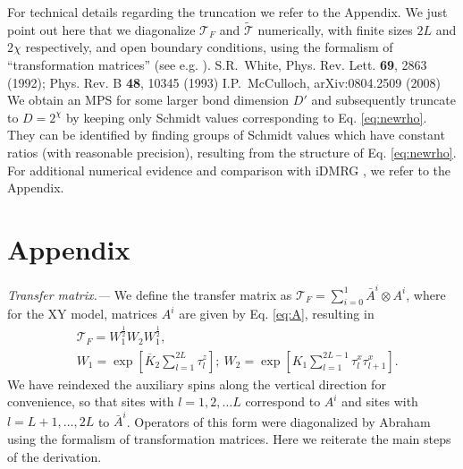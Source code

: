 \documentclass[prl,twocolumn,showpacs,floatfix,superscriptaddress,nofootinbib]{revtex4-1}
\newcommand{\Br}[1]{\left[#1\right]}
\begin{document}
\begin{thebibliography}{99}
 {For technical details regarding the truncation we refer to the Appendix. We just point out here that we diagonalize $\mathcal{T}_F$ and $\tilde{ \mathcal{T}}$ numerically, with finite sizes $2L$ and $2\chi$ respectively, and open boundary conditions, using the formalism of ``transformation matrices'' (see e.g.  \cite{Abraham1971}).}
  S.R.~White, Phys. Rev. Lett. {\bf 69}, 2863 (1992); 
 Phys. Rev. B {\bf 48}, 10345 (1993)
  I.P.~McCulloch, arXiv:0804.2509 (2008)
  We obtain an MPS for some larger bond dimension $D'$ and subsequently truncate to $D=2^\chi$ by keeping only Schmidt values corresponding to Eq. \eqref{eq:newrho}. They can be identified by finding groups of Schmidt values which have constant ratios (with reasonable precision), resulting from the structure of Eq. \eqref{eq:newrho}. 
 For additional numerical evidence and comparison with iDMRG \cite{DMRG,McCulloch2008}, we refer to the Appendix.

\end{thebibliography}
 

\renewcommand{\theequation}{A\arabic{equation}}
\setcounter{equation}{0}    %
\section*{Appendix}           %
\setcounter{figure}{0}                                           %
\renewcommand{\thefigure}{A\arabic{figure}}     %

{\it Transfer matrix.--- } We define the transfer matrix as $\mathcal{T}_F  = \sum_{i=0}^1 \bar{A}^{i} \otimes A^{i}$, where for the XY model, matrices $A^i$ are given by Eq. \eqref{eq:A}, resulting in
\begin{eqnarray}  
      &\mathcal{T}_F = W_1^{\frac12} W_2 W_1^{\frac12}, \\
      &W_1 = \exp\Br{\overline K_2 \sum_{l=1}^{2L}  \tau^z_l};  \ W_2 = \exp\Br{ K_1 \sum_{l=1}^{2L-1} \tau^x_l \tau^x_{l+1}}. \nonumber
\end{eqnarray}
We have reindexed the auxiliary spins along the vertical direction for convenience, so that sites with $l=1,2,\dotsc L$ correspond to $A^i$ and sites with $l=L+1,\dotsc, 2 L$ to $\bar{A}^{i}$. 
Operators of this form were diagonalized by Abraham \cite{a:Abraham1971} using the formalism of transformation matrices. Here we reiterate the main steps of the derivation.
\end{document}
